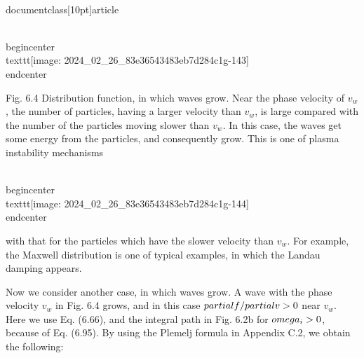 \\documentclass[10pt]{article}
\begin{document}
{{{{\\begin{center}
\\texttt{[image: 2024\_02\_26\_83e36543483eb7d284c1g-143]}
\\end{center}

Fig. 6.4 Distribution function, in which waves grow. Near the phase velocity of $v_{w}$, the number of particles, having a larger velocity than $v_{w}$, is large compared with the number of the particles moving slower than $v_{w}$. In this case, the waves get some energy from the particles, and consequently grow. This is one of plasma instability mechanisms

\\begin{center}
\\texttt{[image: 2024\_02\_26\_83e36543483eb7d284c1g-144]}
\\end{center}

with that for the particles which have the slower velocity than $v_{w}$. For example, the Maxwell distribution is one of typical examples, in which the Landau damping appears.

Now we consider another case, in which waves grow. A wave with the phase velocity $v_{w}$ in Fig. 6.4 grows, and in this case $\\partial f / \\partial v>0$ near $v_{w}$. Here we use Eq. (6.66), and the integral path in Fig. 6.2b for $\\omega_{i}>0$, because of Eq. (6.95). By using the Plemelj formula in Appendix C.2, we obtain the following:


}}}}
\end{document}

